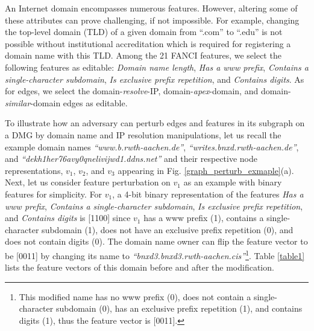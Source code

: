 \documentclass[conference,compsoc]{IEEEtran}
\begin{document}
\par An Internet domain encompasses numerous features. However, altering some of these attributes can prove challenging, if not impossible. For example, changing the top-level domain (TLD) of a given domain from ``.com'' to ``.edu'' is not possible without institutional accreditation which is required for registering a domain name with this TLD. Among the 21 FANCI features, we select the following features as editable: \textit{Domain name length}, \textit{Has a www prefix}, \textit{Contains a single-character subdomain}, \textit{Is exclusive prefix repetition}, and \textit{Contains digits}. As for edges, we select the domain-\textit{resolve}-IP, domain-\textit{apex}-domain, and domain-\textit{similar}-domain edges \cite{sun2019hindom,sun2020deepdom,sun2020hgdom,zhang2021attributed,li2022heterogeneous} as editable. 










\par To illustrate how an adversary can perturb edges and features in its subgraph on a DMG by domain name and IP resolution manipulations, let us recall the example domain names \textit{``www.b.rwth-aachen.de''}, \textit{``writes.bnxd.rwth-aachen.de''}, and \textit{``dekh1her76avy0qnelivijwd1.ddns.net''} and their respective node representations, $v_1$, $v_2$, and $v_3$ appearing in Fig. \ref{graph_perturb_exmaple}(a). Next, let us consider feature perturbation on $v_1$ as an example with binary features for simplicity. For $v_1$, a 4-bit binary representation of the features \textit{Has a www prefix}, \textit{Contains a single-character subdomain}, \textit{Is exclusive prefix repetition}, and \textit{Contains digits} is [1100] since $v_1$ has a www prefix (1), contains a single-character subdomain (1), does not have an exclusive prefix repetition (0), and does not contain digits (0). The domain name owner can flip the feature vector to be [0011] by changing its name to \textit{``bnxd3.bnxd3.rwth-aachen.cis''}\footnote{This modified name has no www prefix (0), does not contain a single-character subdomain (0), has an exclusive prefix repetition (1), and contains digits (1), thus the feature vector is [0011].}. Table \ref{table1} lists the feature vectors of this domain before and after the modification.
\end{document}

